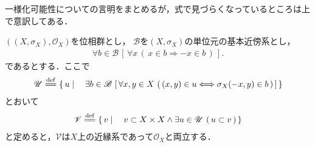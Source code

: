 	一様化可能性についての言明をまとめるが，式で見づらくなっているところは上で意訳してある．
	\begin{screen}
		\begin{thm}[位相群は一様化可能である]\label{thm:topological_groups_are_uniformazable}
			$\left(\left(X,\sigma_X\right),\mathscr{O}_X\right)$を位相群とし，
			$\mathscr{B}$を$\left(X,\sigma_X\right)$の単位元の基本近傍系とし，
			\begin{align}
				\forall b \in \mathscr{B}\, \left[\, \forall x\, (\, x \in b \Longrightarrow -x \in b\, )\, \right].
			\end{align}
			であるとする．ここで
			\begin{align}
				\mathscr{U} \defeq \Set{u}{\exists b \in \mathscr{B}\,
				\left[\, \forall x,y \in X\, \left(\, (x,y) \in u \Longleftrightarrow\sigma_X(-x,y) \in b\, \right)\, \right]}
			\end{align}
			とおいて
			\begin{align}
				\mathscr{V} \defeq \Set{v}{v \subset X \times X \wedge \exists u \in \mathscr{U}\, \left(\, u \subset v\, \right)}
			\end{align}
			と定めると，$\mathscr{V}$は$X$上の近縁系であって$\mathscr{O}_X$と両立する．
		\end{thm}
	\end{screen}
	
